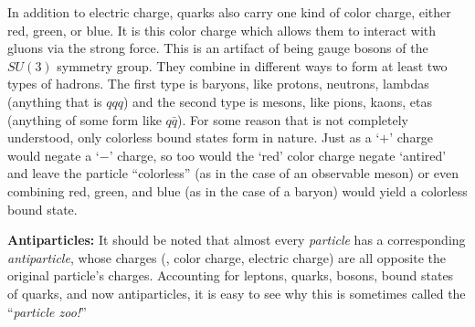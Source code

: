 In addition to electric charge, quarks also carry one kind of color charge, either red, green, or blue. 
It is this color charge which allows them to interact with gluons via the strong force. 
This is an artifact of being gauge bosons of the $SU(3)$ symmetry group.
They combine in different ways to form at least two types of hadrons.
The first type is baryons, like protons, neutrons, lambdas (anything that is $qqq$) and the second type is mesons, like pions, kaons, etas (anything of some form like $q\bar{q}$).  %
For some reason that is not completely understood, only colorless bound states form in nature. 
Just as a `$+$' charge would negate a `$-$' charge, so too would the `red' color charge negate `antired' and leave the particle ``colorless'' (as in the case of an observable meson) or even combining red, green, and blue (as in the case of a baryon) would yield a colorless bound state.

{\bf Antiparticles:} It should be noted that almost every \emph{particle} has a corresponding \emph{antiparticle}, whose charges (\eg, color charge, electric charge) are all opposite the original particle's charges.
Accounting for leptons, quarks, bosons, bound states of quarks, and now antiparticles, it is easy to see why this is sometimes called the ``\emph{particle zoo!}''

